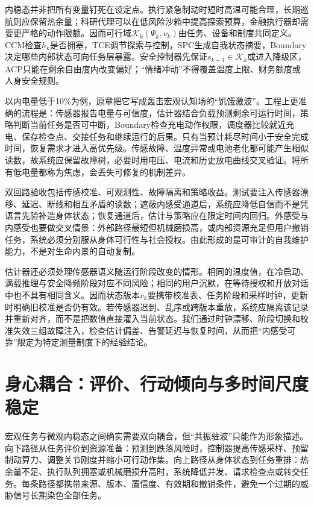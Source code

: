 内稳态并非把所有变量钉死在设定点。执行紧急制动时短时高温可能合理，长期巡航则应保留热余量；科研代理可以在低风险沙箱中提高探索预算，金融执行器却需要更严格的动作限额。因而可行域$\mathcal K_k(\Psi_k,\nu_k)$由任务、设备和制度共同定义。CCM检查$h_k$是否拥塞，TCE调节探索与控制，SPC生成自我状态摘要，Boundary决定哪些内部状态可向任务层暴露。安全控制器先保证$s_{k+1}\in\mathcal K_k$或进入降级区，ACP只能在剩余自由度内改变偏好；“情绪冲动”不得覆盖温度上限、财务额度或人身安全规则。

以内电量低于10\%为例，原章把它写成轰击宏观认知场的“饥饿激波”。工程上更准确的流程是：传感器报告电量与可信度，估计器结合负载预测剩余可运行时间，策略判断当前任务是否可中断，Boundary检查充电动作权限，调度器比较就近充电、保存检查点、交接任务和继续运行的后果。只有当预计耗尽时间小于安全完成时间，恢复需求才进入高优先级。传感故障、温度异常或电池老化都可能产生相似读数，故系统应保留故障树，必要时用电压、电流和历史放电曲线交叉验证。将所有低电量都称为焦虑，会丢失可修复的机制差异。

双回路验收包括传感校准、可观测性、故障隔离和策略收益。测试要注入传感器漂移、延迟、断线和相互矛盾的读数；遮蔽内感受通道后，系统应降低自信而不是凭语言先验补造身体状态；恢复通道后，估计与策略应在限定时间内回归。外感受与内感受也要做交叉情景：外部路径最短但机械磨损高，或内部资源充足但用户撤销任务，系统必须分别服从身体可行性与社会授权。由此形成的是可审计的自我维护能力，不是对生命内景的自动复制。

估计器还必须处理传感器语义随运行阶段改变的情形。相同的温度值，在冷启动、满载推理与安全降频阶段对应不同风险；相同的用户沉默，在等待授权和开放对话中也不具有相同含义。因而状态版本$v_k$要携带校准表、任务阶段和采样时钟，更新时明确旧校准是否仍有效。若传感器迟到、乱序或跨版本重放，系统应隔离该记录并重新对齐，而不是把数值直接灌入当前状态。我们通过时钟漂移、阶段切换和校准失效三组故障注入，检查估计偏差、告警延迟与恢复时间，从而把“内感受可靠”限定为特定测量制度下的经验结论。

\section{身心耦合：评价、行动倾向与多时间尺度稳定}
\label{sec:somatic_resonance_loop}

宏观任务与微观内稳态之间确实需要双向耦合，但“共振驻波”只能作为形象描述。向下路径从任务评价到资源准备：预测到跌落风险时，控制器提高传感采样、预留制动算力、调整关节刚度并缩小可行动作集。向上路径从身体状态到任务重排：热余量不足、执行队列拥塞或机械磨损升高时，系统降低并发、请求检查点或转交任务。每条路径都携带来源、版本、置信度、有效期和撤销条件，避免一个过期的威胁信号长期染色全部任务。

